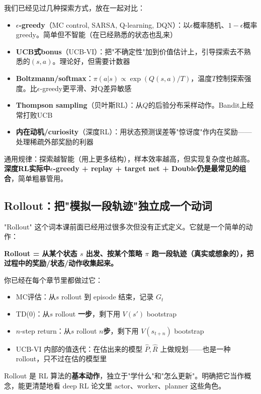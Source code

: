 \documentclass[11pt,a4paper]{article}
\theoremstyle{definition}
\begin{document}
\begin{plainwords}
我们已经见过几种探索方式，放在一起对比：
\begin{itemize}
\item \textbf{$\epsilon$-greedy}（MC control, SARSA, Q-learning, DQN）：以$\epsilon$概率随机、$1-\epsilon$概率greedy。简单但不智能（在已经熟悉的状态也乱来）
\item \textbf{UCB式bonus}（UCB-VI）：把"不确定性"加到价值估计上，引导探索去不熟悉的$(s,a)$。理论好，但需要计数器
\item \textbf{Boltzmann/softmax}：$\pi(a|s) \propto \exp(Q(s,a)/T)$，温度$T$控制探索强度。比$\epsilon$-greedy更平滑、对Q差异敏感
\item \textbf{Thompson sampling}（贝叶斯RL）：从$Q$的后验分布采样动作。Bandit上经常打败UCB
\item \textbf{内在动机/curiosity}（深度RL）：用状态预测误差等"惊讶度"作内在奖励——处理稀疏外部奖励的利器
\end{itemize}

通用规律：探索越智能（用上更多结构），样本效率越高，但实现复杂度也越高。\textbf{深度RL实际中$\epsilon$-greedy + replay + target net + Double仍是最常见的组合}，简单粗暴管用。
\end{plainwords}

\subsection{Rollout：把"模拟一段轨迹"独立成一个动词}

\begin{plainwords}
"Rollout" 这个词本课前面已经用过很多次但没有正式定义。它就是一个简单的动作：

\textbf{Rollout = 从某个状态 $s$ 出发、按某个策略 $\pi$ 跑一段轨迹（真实或想象的），把过程中的奖励/状态/动作收集起来。}

你已经在每个章节里都做过它：
\begin{itemize}
\item MC评估：从$s$ rollout 到 episode 结束，记录 $G_t$
\item TD(0)：从$s$ rollout \textbf{一步}，剩下用 $V(s')$ bootstrap
\item $n$-step return：从$s$ rollout \textbf{$n$步}，剩下用 $V(s_{t+n})$ bootstrap
\item UCB-VI 内部的值迭代：在估出来的模型 $\hat P, \hat R$ 上做规划——也是一种 rollout，只不过在估的模型里
\end{itemize}

Rollout 是 RL 算法的\textbf{基本动作}，独立于"学什么"和"怎么更新"。明确把它当作概念，能更清楚地看 deep RL 论文里 actor、worker、planner 这些角色。
\end{plainwords}
\end{document}
